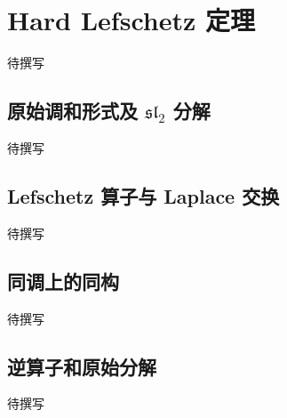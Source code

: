 
% 
% 

\section{Hard Lefschetz 定理}
\label{g4:sec:1705}

待撰写

\subsection{\texorpdfstring{原始调和形式及 \(\mathfrak{sl}_2\) 分解}{原始调和形式及 sl₂ 分解}}
\label{g4:subsec:1705:01}
待撰写

\subsection{Lefschetz 算子与 Laplace 交换}
\label{g4:subsec:1705:02}
待撰写

\subsection{同调上的同构}
\label{g4:subsec:1705:03}
待撰写

\subsection{逆算子和原始分解}
\label{g4:subsec:1705:04}
待撰写
